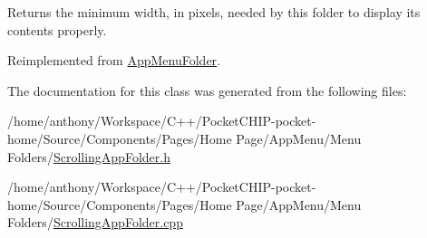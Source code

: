 \begin{DoxyReturn}{Returns}
the minimum width, in pixels, needed by this folder to display its contents properly. 
\end{DoxyReturn}


Reimplemented from \mbox{\hyperlink{classAppMenuFolder_a0c46e9cfa9d2c3d5db1b0e8fe5d00fb9}{App\+Menu\+Folder}}.



The documentation for this class was generated from the following files\+:\begin{DoxyCompactItemize}
\item 
/home/anthony/\+Workspace/\+C++/\+Pocket\+C\+H\+I\+P-\/pocket-\/home/\+Source/\+Components/\+Pages/\+Home Page/\+App\+Menu/\+Menu Folders/\mbox{\hyperlink{ScrollingAppFolder_8h}{Scrolling\+App\+Folder.\+h}}\item 
/home/anthony/\+Workspace/\+C++/\+Pocket\+C\+H\+I\+P-\/pocket-\/home/\+Source/\+Components/\+Pages/\+Home Page/\+App\+Menu/\+Menu Folders/\mbox{\hyperlink{ScrollingAppFolder_8cpp}{Scrolling\+App\+Folder.\+cpp}}\end{DoxyCompactItemize}
